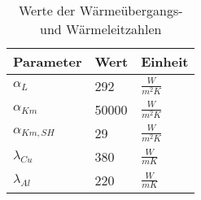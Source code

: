 \begin{table}[]
\centering
\caption{Werte der Wärmeübergangs- und Wärmeleitzahlen}
\label{tab:Werte der Wärmeübergangs- und Wärmeleitzahlen}
\renewcommand{\arraystretch}{1.2}
\begin{tabular}{|l|l|l|}

\hline
Parameter        & Wert  & Einheit           \\ \hline
$\alpha_{L}$     & 292   & $\frac{W}{m^2 K}$ \\
$\alpha_{Km}$    & 50000 & $\frac{W}{m^2 K}$ \\
$\alpha_{Km,SH}$ & 29    & $\frac{W}{m^2 K}$ \\
$\lambda_{Cu}$   & 380   & $\frac{W}{m K}$   \\
$\lambda_{Al}$   & 220   & $\frac{W}{m K}$   \\ \hline
\end{tabular}
\end{table}